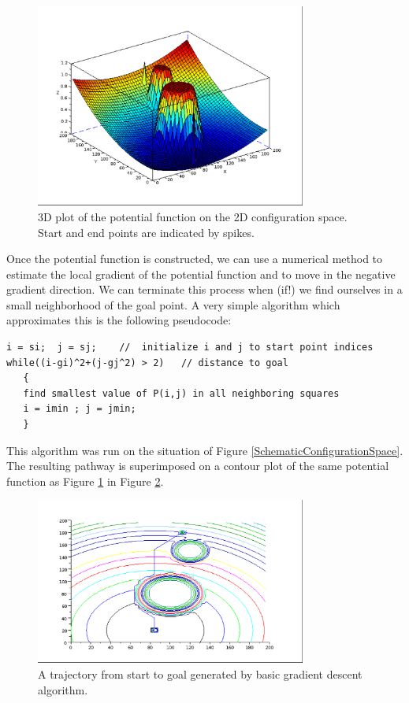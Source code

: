 \begin{figure}
\centering
\includegraphics[width=3.5in]{figs08/3d.eps}
\caption{3D plot of the potential function on the 2D configuration space. Start and end points are indicated by spikes.}\label{3DplotPotentialFunction}
\end{figure}

Once the potential function is constructed, we can use a numerical method to estimate the local gradient of the potential function and to move in the negative gradient direction.  We can terminate this process when (if!) we find ourselves in a small neighborhood of the goal point.  A very simple algorithm which approximates this is the following pseudocode:

\begin{verbatim}
i = si;  j = sj;    //  initialize i and j to start point indices
while((i-gi)^2+(j-gj^2) > 2)   // distance to goal
   {
   find smallest value of P(i,j) in all neighboring squares
   i = imin ; j = jmin; 
   }
\end{verbatim}

This algorithm was run on the situation of Figure \ref{SchematicConfigurationSpace}.   The resulting pathway is superimposed on a contour plot of the same potential function as Figure \ref{3DplotPotentialFunction} in Figure \ref{ContourWithPlan}.

\begin{figure}
\centering
\includegraphics[width=3.5in]{figs08/contourwplan.eps}
\caption{A trajectory from start to goal generated by basic gradient descent algorithm.
}\label{ContourWithPlan}
\end{figure}

